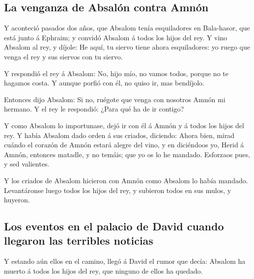 \hypertarget{la-venganza-de-absaluxf3n-contra-amnuxf3n}{%
\subsection{La venganza de Absalón contra
Amnón}\label{la-venganza-de-absaluxf3n-contra-amnuxf3n}}

 Y aconteció pasados dos años, que Absalom tenía
esquiladores en Bala-hasor, que está junto á Ephraim; y convidó Absalom
á todos los hijos del rey.  Y vino Absalom al rey, y
díjole: He aquí, tu siervo tiene ahora esquiladores: yo ruego que venga
el rey y sus siervos con tu siervo.

 Y respondió el rey á Absalom: No, hijo mío, no vamos
todos, porque no te hagamos costa. Y aunque porfió con él, no quiso ir,
mas bendíjolo.

 Entonces dijo Absalom: Si no, ruégote que venga con
nosotros Amnón mi hermano. Y el rey le respondió: ¿Para qué ha de ir
contigo?

 Y como Absalom lo importunase, dejó ir con él á Amnón y á
todos los hijos del rey.  Y había Absalom dado orden á sus
criados, diciendo: Ahora bien, mirad cuándo el corazón de Amnón estará
alegre del vino, y en diciéndoos yo, Herid á Amnón, entonces matadle, y
no temáis; que yo os lo he mandado. Esforzaos pues, y sed valientes.

 Y los criados de Absalom hicieron con Amnón como Absalom
lo había mandado. Levantáronse luego todos los hijos del rey, y subieron
todos en sus mulos, y huyeron.

\hypertarget{los-eventos-en-el-palacio-de-david-cuando-llegaron-las-terribles-noticias}{%
\subsection{Los eventos en el palacio de David cuando llegaron las
terribles
noticias}\label{los-eventos-en-el-palacio-de-david-cuando-llegaron-las-terribles-noticias}}

 Y estando aún ellos en el camino, llegó á David el rumor
que decía: Absalom ha muerto á todos los hijos del rey, que ninguno de
ellos ha quedado.

